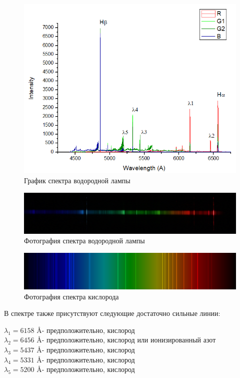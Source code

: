 \documentclass[a4paper]{article}
\begin{document}
\begin{enumerate}
    \begin{figure}[h]
    \centering
    \includegraphics[width=\textwidth]{Graph2_1.PNG}
    \caption{График спектра водородной лампы}
    \label{fig:vac}
\end{figure}

\begin{figure}[h]
    \centering
    \includegraphics[width=15cm]{Hydrogene-cut.jpg}
    \caption{Фотография спектра водородной лампы}
    \label{fig:vac}
\end{figure}

\begin{figure}[h]
    \centering
    \includegraphics[width=15cm]{Oxygen_spectrum_visible.png}
    \caption{Фотография спектра кислорода}
    \label{fig:vac}
\end{figure}

В спектре также присутствуют следующие достаточно сильные линии:
\begin{center}
    $\lambda_1 = 6158$ \AA - предположительно, кислород \\
    $\lambda_2 = 6456$ \AA - предположительно, кислород или ионизированный азот \\
    $\lambda_3 = 5437$ \AA - предположительно, кислород \\
    $\lambda_4 = 5331$ \AA - предположительно, кислород \\
    $\lambda_5 = 5200$ \AA - предположительно, кислород \\
\end{center}


\end{enumerate}
\end{document}
